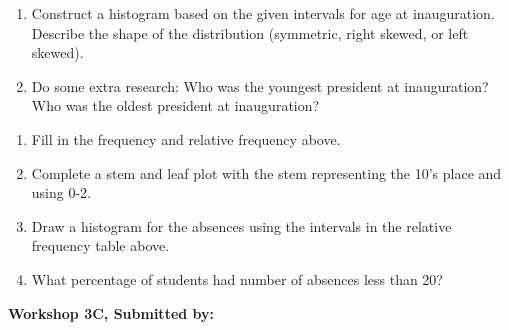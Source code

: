 \documentclass[11pt]{book}\usepackage[]{graphicx}\usepackage[]{color}
\begin{document}
\begin{exercises}
\begin{exercise}
\begin{enumerate}
    \item	Construct a histogram based on the given intervals for age at inauguration.  Describe the shape of the distribution (symmetric, right skewed, or left skewed).
    \item Do some extra research: Who was the youngest president at inauguration? Who was the oldest president at inauguration?
\end{enumerate}

    \end{exercise}
    \begin{solution} %

\begin{enumerate}
  \item	Fill in the frequency and relative frequency above.
  \item	Complete a stem and leaf plot with the stem representing the 10's place and using 0-2.
  \item	Draw a histogram for the absences using the intervals in the relative frequency table above.
  \item	What percentage of students had number of absences less than 20?
\end{enumerate}

    \end{solution}

\clearpage

    \begin{exercise}  %

    \begin{center}
\begin{flushleft}\textbf{\large \hfill Workshop 3C, Submitted by: }\end{flushleft}

\end{center}


\end{exercise}
\end{exercises}
\end{document}
